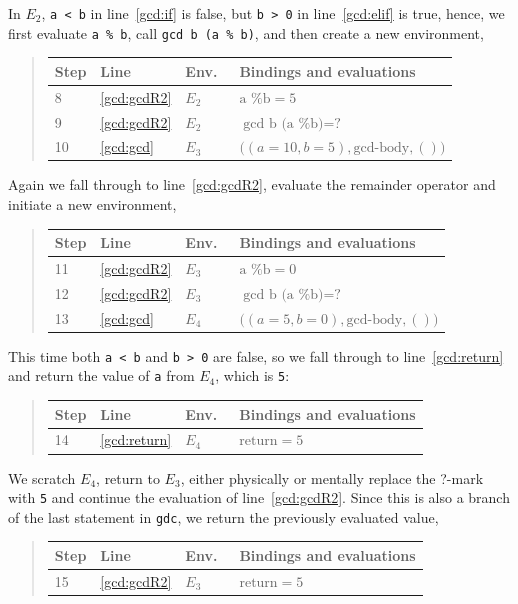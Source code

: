 \documentclass[springer.tex]{subfiles}
\begin{document}
In $E_2$, \lstinline!a < b! in line~\ref{gcd:if} is false, but
\lstinline!b > 0! in line~\ref{gcd:elif} is true, hence, we first
evaluate \lstinline{a % b}, call \lstinline{gcd b (a % b)}, and then create a new environment,
\begin{quote}
  \begin{tabular*}{0.6\linewidth}{l|lll}
    Step & Line & Env.\ & Bindings and evaluations\\
    \hline
    8&\ref{gcd:gcdR2} & $E_2$ & $\text{a \% b} = 5$\\
    9&\ref{gcd:gcdR2} & $E_2$ & $\text{gcd b (a \% b)} = \text{?}$\\
    10&\ref{gcd:gcd} & $E_3$ &$\big((a = 10, b = 5), \text{gcd-body}, ()\big)$\\
  \end{tabular*}
\end{quote}
Again we fall through to line~\ref{gcd:gcdR2}, evaluate the remainder operator and initiate a new environment,
\begin{quote}
  \begin{tabular*}{0.6\linewidth}{l|lll}
    Step & Line & Env.\ & Bindings and evaluations\\
    \hline
    11&\ref{gcd:gcdR2} & $E_3$ & $\text{a \% b} = 0$\\
    12&\ref{gcd:gcdR2} & $E_3$ & $\text{gcd b (a \% b)} = \text{?}$\\
    13&\ref{gcd:gcd} & $E_4$ & $\big((a = 5, b = 0), \text{gcd-body}, ()\big)$\\
  \end{tabular*}
\end{quote}
This time both \lstinline!a < b! and \lstinline!b > 0! are false, so we fall through to line~\ref{gcd:return} and return the value of \lstinline!a! from $E_4$, which is \lstinline!5!:
\begin{quote}
  \begin{tabular*}{0.6\linewidth}{l|lll}
    Step & Line & Env.\ & Bindings and evaluations\\
    \hline
    14&\ref{gcd:return} & $E_4$ & $\text{return} = 5$\\
  \end{tabular*}
\end{quote}
We scratch $E_4$, return to $E_3$, either physically or mentally replace the ?-mark with \lstinline!5! and continue the evaluation of line~\ref{gcd:gcdR2}. Since this is also a branch of the last statement in \lstinline{gdc}, we return the previously evaluated value,
\begin{quote}
  \begin{tabular*}{0.6\linewidth}{l|lll}
    Step & Line & Env.\ & Bindings and evaluations\\
    \hline
    15&\ref{gcd:gcdR2} & $E_3$ & $\text{return} = 5$\\
  \end{tabular*}
\end{quote}
\end{document}
